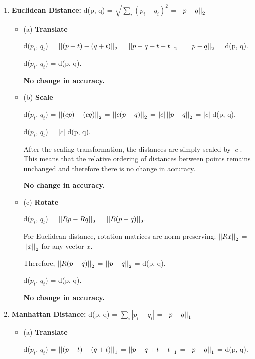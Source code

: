 \documentclass[fleqn]{article}
\begin{document}
\begin{enumerate}
	\item \textbf{Euclidean Distance:} d(p, q) = $\sqrt{\sum_i (p_i - q_i)^2}$ = $\left\vert\left\vert p - q \right\vert\right\vert_2$
	      \begin{itemize}
		      \item (a) \textbf{Translate}

		            d($p_t$, $q_t$) = $\left\vert\left\vert (p + t) - (q + t) \right\vert\right\vert_2$ = $\left\vert\left\vert p - q + t  - t \right\vert\right\vert_2$ = $\left\vert\left\vert p - q \right\vert\right\vert_2$ = d(p, q).

		            d($p_t$, $q_t$) = d(p, q).

		            \textbf{No change in accuracy.}

		      \item (b) \textbf{Scale}

		            d($p_t$, $q_t$) = $\left\vert\left\vert (c p) - (c q) \right\vert\right\vert_2$ = $\left\vert\left\vert c (p - q) \right\vert\right\vert_2$ = $|c| \left\vert\left\vert p - q \right\vert\right\vert_2$ = $|c|$ d(p, q).

		            d($p_t$, $q_t$) = $|c|$ d(p, q).

		            After the scaling transformation, the distances are simply scaled by $|c|$.
		            This means that the relative ordering of distances between points remains unchanged and therefore there is no change in accuracy.

		            \textbf{No change in accuracy.}

		      \item (c) \textbf{Rotate}

		            d($p_t$, $q_t$) = $\left\vert\left\vert R p - R q \right\vert\right\vert_2$ = $\left\vert\left\vert R (p - q) \right\vert\right\vert_2$.

		            For Euclidean distance, rotation matrices are norm preserving: $\left\vert\left\vert R x \right\vert\right\vert_2$ = $\left\vert\left\vert x \right\vert\right\vert_2$ for any vector $x$.

		            Therefore, $\left\vert\left\vert R (p - q) \right\vert\right\vert_2$ = $\left\vert\left\vert p - q \right\vert\right\vert_2$ = d(p, q).

		            d($p_t$, $q_t$) = d(p, q).

		            \textbf{No change in accuracy.}
	      \end{itemize}

	\item \textbf{Manhattan Distance:} d(p, q) = $\sum_i |p_i - q_i|$ = $\left\vert\left\vert p - q \right\vert\right\vert_1$
	      \begin{itemize}
		      \item (a) \textbf{Translate}

		            d($p_t$, $q_t$) = $\left\vert\left\vert (p + t) - (q + t) \right\vert\right\vert_1$ = $\left\vert\left\vert p - q + t  - t \right\vert\right\vert_1$ = $\left\vert\left\vert p - q \right\vert\right\vert_1$ = d(p, q).


\end{itemize}
\end{enumerate}
\end{document}
